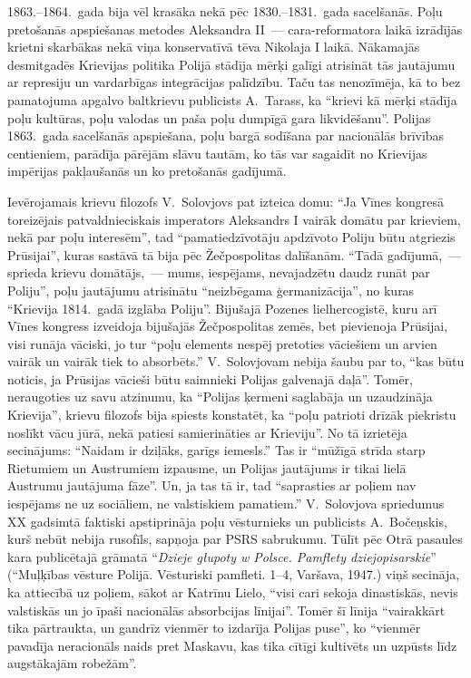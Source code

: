 \documentclass[twoside,a5paper,12pt,fleqn,openany]{extbook}
\newcommand{\pltxti}[1]{\textit{\textpolish{#1}}}
\begin{document}
 1863.--1864.~gada  bija vēl krasāka nekā pēc 1830.--1831.~gada sacelšanās. Poļu pretošanās apspiešanas metodes Aleksandra II~--- cara-reformatora laikā izrādījās krietni skarbākas nekā viņa konservatīvā tēva Nikolaja I laikā. Nākamajās desmitgadēs Krievijas politika Polijā stādīja mērķi galīgi atrisināt tās jautājumu ar represiju un vardarbīgas integrācijas palīdzību. Taču tas nenozīmēja, kā to bez pamatojuma apgalvo baltkrievu publicists A.~Tarass, ka ``krievi kā mērķi stādīja poļu kultūras, poļu valodas un paša poļu dumpīgā gara likvidēšanu''. Polijas 1863.~gada sacelšanās apspiešana, poļu bargā sodīšana par nacionālās brīvības centieniem, parādīja pārējām slāvu tautām, ko tās var sagaidīt no Krievijas impērijas pakļaušanās un ko pretošanās gadījumā.

Ievērojamais krievu filozofs V.~Solovjovs pat izteica domu: ``Ja Vīnes kongresā toreizējais patvaldnieciskais imperators Aleksandrs I vairāk domātu par krieviem, nekā par poļu interesēm'', tad ``pamatiedzīvotāju apdzīvoto Poliju būtu atgriezis Prūsijai'', kuras sastāvā tā bija pēc Žečpospolitas dalīšanām. ``Tādā gadījumā,~--- sprieda krievu domātājs,~--- mums, iespējams, nevajadzētu daudz runāt par Poliju'', poļu jautājumu atrisinātu ``neizbēgama ģermanizācija'', no kuras ``Krievija 1814.~gadā izglāba Poliju''. Bijušajā Pozenes lielhercogistē, kuru arī Vīnes kongress izveidoja bijušajās Žečpospolitas zemēs, bet pievienoja Prūsijai, visi runāja vāciski, jo tur ``poļu elements nespēj pretoties vāciešiem un arvien vairāk un vairāk tiek to absorbēts.'' V.~Solovjovam nebija šaubu par to, ``kas būtu noticis, ja Prūsijas vācieši būtu saimnieki Polijas galvenajā daļā''. Tomēr, neraugoties uz savu atzinumu, ka ``Polijas ķermeni saglabāja un uzaudzināja Krievija'', krievu filozofs bija spiests konstatēt, ka ``poļu patrioti drīzāk piekristu noslīkt vācu jūrā, nekā patiesi samierināties ar Krieviju''. No tā izrietēja secinājums: ``Naidam ir dziļāks, garīgs iemesls.'' Tas ir ``mūžīgā strīda starp Rietumiem un Austrumiem izpausme, un Polijas jautājums ir tikai lielā Austrumu jautājuma fāze''. Un, ja tas tā ir, tad ``saprasties ar poļiem nav iespējams ne uz sociāliem, ne valstiskiem pamatiem.'' V.~Solovjova spriedumus XX gadsimtā faktiski apstiprināja poļu vēsturnieks un publicists A.~Bočeņskis, kurš nebūt nebija rusofīls, sapņoja par PSRS sabrukumu. Tūlīt pēc Otrā pasaules kara publicētajā grāmatā ``\pltxti{Dzieje głupoty w Polsce. Pamflety dziejopisarskie}'' (``Muļķības vēsture Polijā. Vēsturiski pamfleti. 1--4, Varšava, 1947.) viņš secināja, ka attiecībā uz poļiem, sākot ar Katrīnu Lielo, ``visi cari sekoja dinastiskās, nevis valstiskās un jo īpaši nacionālās absorbcijas līnijai''. Tomēr šī līnija ``vairakkārt tika pārtraukta, un gandrīz vienmēr to izdarīja Polijas puse'', ko ``vienmēr pavadīja neracionāls naids pret Maskavu, kas tika cītīgi kultivēts un uzpūsts līdz augstākajām robežām''.
\end{document}
